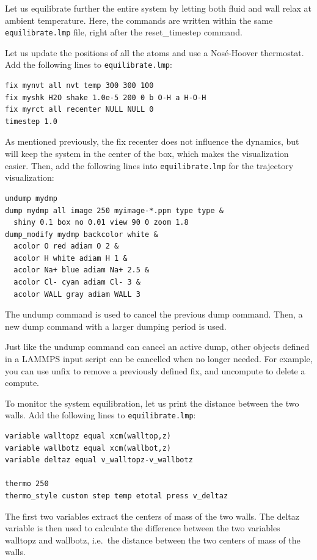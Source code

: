 \documentclass[9pt,tutorial]{livecoms}
\newcommand{\lmpcmd}[1]{\hspace{0pt}\colorbox{listing}{\textcolor{command}{\small{#1}}}\hspace{0pt}} %
\newcommand{\flecmd}[1]{\textcolor{command}{\texttt{#1}}} %
\begin{document}
Let us equilibrate further the entire system by letting both fluid and {\color{blue}wall}
relax at ambient temperature.  Here, the commands are written within the same
\flecmd{equilibrate.lmp} file, right after the \lmpcmd{reset\_timestep} command.

Let us update the positions of all the atoms and use a Nosé-Hoover
thermostat.  Add the following lines to \flecmd{equilibrate.lmp}:
\begin{lstlisting}
fix mynvt all nvt temp 300 300 100
fix myshk H2O shake 1.0e-5 200 0 b O-H a H-O-H
fix myrct all recenter NULL NULL 0
timestep 1.0
\end{lstlisting}
As mentioned previously, the \lmpcmd{fix recenter} does not influence the dynamics,
but will keep the system in the center of the box, which makes the
visualization easier.  Then, add the following lines into \flecmd{equilibrate.lmp}
for the trajectory visualization:
\begin{lstlisting}
undump mydmp
dump mydmp all image 250 myimage-*.ppm type type &
  shiny 0.1 box no 0.01 view 90 0 zoom 1.8
dump_modify mydmp backcolor white &
  acolor O red adiam O 2 &
  acolor H white adiam H 1 &
  acolor Na+ blue adiam Na+ 2.5 &
  acolor Cl- cyan adiam Cl- 3 &
  acolor WALL gray adiam WALL 3
\end{lstlisting}
The \lmpcmd{undump} command is used to cancel the previous \lmpcmd{dump} command.
Then, a new \lmpcmd{dump} command with a larger dumping period is used.

\begin{note}
{\color{blue}
Just like the \lmpcmd{undump} command can cancel an active \lmpcmd{dump}, other
objects defined in a LAMMPS input script can be cancelled when no longer needed. 
For example, you can use \lmpcmd{unfix} to remove a previously defined \lmpcmd{fix}, and
\lmpcmd{uncompute} to delete a \lmpcmd{compute}.}
\end{note}

To monitor the system equilibration, let us print the distance between
the two walls.  Add the following lines to \flecmd{equilibrate.lmp}:
\begin{lstlisting}
variable walltopz equal xcm(walltop,z)
variable wallbotz equal xcm(wallbot,z)
variable deltaz equal v_walltopz-v_wallbotz

thermo 250
thermo_style custom step temp etotal press v_deltaz
\end{lstlisting}
The first two variables extract the centers of mass of the two walls.  The
\lmpcmd{deltaz} variable is then used to calculate the difference between the two
variables \lmpcmd{walltopz} and \lmpcmd{wallbotz}, i.e.~the distance between the
two centers of mass of the walls.
\end{document}
